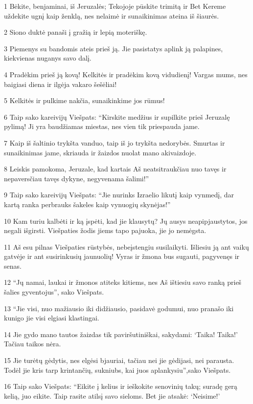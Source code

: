 \par 1 Bėkite, benjaminai, iš Jeruzalės; Tekojoje pūskite trimitą ir Bet Kereme uždekite ugnį kaip ženklą, nes nelaimė ir sunaikinimas ateina iš šiaurės. 
\par 2 Siono duktė panaši į gražią ir lepią moteriškę. 
\par 3 Piemenys su bandomis ateis prieš ją. Jie pasistatys aplink ją palapines, kiekvienas nuganys savo dalį. 
\par 4 Pradėkim prieš ją kovą! Kelkitės ir pradėkim kovą vidudienį! Vargas mums, nes baigiasi diena ir ilgėja vakaro šešėliai! 
\par 5 Kelkitės ir pulkime nakčia, sunaikinkime jos rūmus! 
\par 6 Taip sako kareivijų Viešpats: “Kirskite medžius ir supilkite prieš Jeruzalę pylimą! Ji yra baudžiamas miestas, nes vien tik priespauda jame. 
\par 7 Kaip iš šaltinio trykšta vanduo, taip iš jo trykšta nedorybės. Smurtas ir sunaikinimas jame, skriauda ir žaizdos nuolat mano akivaizdoje. 
\par 8 Leiskis pamokoma, Jeruzale, kad kartais Aš neatsitraukčiau nuo tavęs ir nepaversčiau tavęs dykyne, negyvenama šalimi!” 
\par 9 Taip sako kareivijų Viešpats: “Jie nurinks Izraelio likutį kaip vynmedį, dar kartą ranka perbrauks šakeles kaip vynuogių skynėjas!” 
\par 10 Kam turiu kalbėti ir ką įspėti, kad jie klausytų? Jų ausys neapipjaustytos, jos negali išgirsti. Viešpaties žodis jiems tapo pajuoka, jie jo nemėgsta. 
\par 11 Aš esu pilnas Viešpaties rūstybės, nebeįstengiu susilaikyti. Išliesiu ją ant vaikų gatvėje ir ant susirinkusių jaunuolių! Vyras ir žmona bus sugauti, pagyvenęs ir senas. 
\par 12 “Jų namai, laukai ir žmonos atiteks kitiems, nes Aš ištiesiu savo ranką prieš šalies gyventojus”,­ sako Viešpats. 
\par 13 “Jie visi, nuo mažiausio iki didžiausio, pasidavė godumui, nuo pranašo iki kunigo jie visi elgiasi klastingai. 
\par 14 Jie gydo mano tautos žaizdas tik paviršutiniškai, sakydami: ‘Taika! Taika!’ Tačiau taikos nėra. 
\par 15 Jie turėtų gėdytis, nes elgėsi bjauriai, tačiau nei jie gėdijasi, nei parausta. Todėl jie kris tarp krintančių, sukniubs, kai juos aplankysiu”,­sako Viešpats. 
\par 16 Taip sako Viešpats: “Eikite į kelius ir ieškokite senovinių takų; suradę gerą kelią, juo eikite. Taip rasite atilsį savo sieloms. Bet jie atsakė: ‘Neisime!’ 
